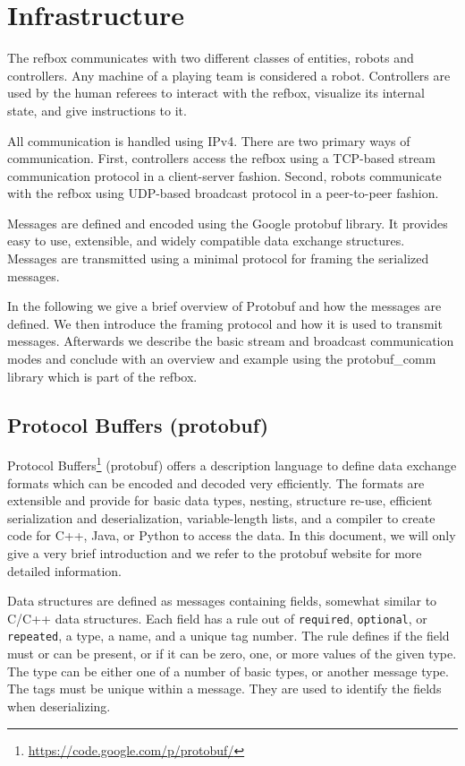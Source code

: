 \documentclass[a4paper]{article}
\begin{document}
\section{Infrastructure}
\label{sec:infrastructure}
The refbox communicates with two different classes of entities, robots
and controllers. Any machine of a playing team is considered a
robot. Controllers are used by the human referees to interact with the
refbox, visualize its internal state, and give instructions to it.

All communication is handled using IPv4. There are two primary ways of
communication. First, controllers access the refbox using a TCP-based
stream communication protocol in a client-server fashion. Second,
robots communicate with the refbox using UDP-based broadcast protocol
in a peer-to-peer fashion.

Messages are defined and encoded using the Google protobuf library. It
provides easy to use, extensible, and widely compatible data exchange
structures. Messages are transmitted using a minimal protocol for
framing the serialized messages.

In the following we give a brief overview of Protobuf and how the
messages are defined. We then introduce the framing protocol and
how it is used to transmit messages. Afterwards we describe the
basic stream and broadcast communication modes and conclude with an
overview and example using the protobuf\_comm library which is part
of the refbox.

\subsection{Protocol Buffers (protobuf)}
Protocol
Buffers\footnote{\url{https://code.google.com/p/protobuf/}\label{fn:protobuf}}
(protobuf) offers a description language to define data exchange
formats which can be encoded and decoded very efficiently. The formats
are extensible and provide for basic data types, nesting, structure
re-use, efficient serialization and deserialization, variable-length
lists, and a compiler to create code for C++, Java, or Python to
access the data. In this document, we will only give a very brief
introduction and we refer to the protobuf website
for more detailed information.

Data structures are defined as messages containing fields, somewhat
similar to C/C++ data structures. Each field has a rule out of
\texttt{required}, \texttt{optional}, or \texttt{repeated}, a type,
a name, and a unique tag number. The rule defines if the field must
or can be present, or if it can be zero, one, or more values of the
given type. The type can be either one of a number of basic types,
or another message type. The tags must be unique within a message.
They are used to identify the fields when deserializing.
\end{document}
